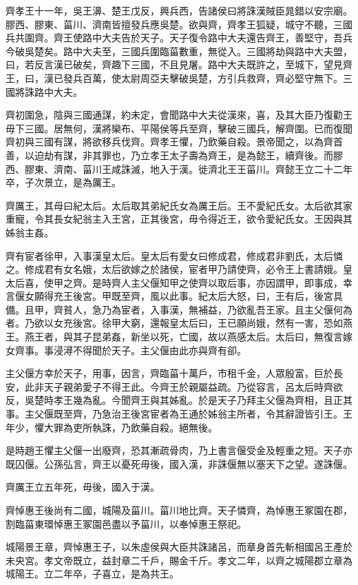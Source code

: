 齊孝王十一年，吳王濞、楚王戊反，興兵西，告諸侯曰將誅漢賊臣晁錯以安宗廟。膠西、膠東、菑川、濟南皆擅發兵應吳楚。欲與齊，齊孝王狐疑，城守不聽，三國兵共圍齊。齊王使路中大夫告於天子。天子復令路中大夫還告齊王，善堅守，吾兵今破吳楚矣。路中大夫至，三國兵圍臨菑數重，無從入。三國將劫與路中大夫盟，曰，若反言漢已破矣，齊趣下三國，不且見屠。路中大夫既許之，至城下，望見齊王，曰，漢已發兵百萬，使太尉周亞夫擊破吳楚，方引兵救齊，齊必堅守無下。三國將誅路中大夫。

齊初圍急，陰與三國通謀，約未定，會聞路中大夫從漢來，喜，及其大臣乃復勸王毋下三國。居無何，漢將欒布、平陽侯等兵至齊，擊破三國兵，解齊圍。已而復聞齊初與三國有謀，將欲移兵伐齊。齊孝王懼，乃飲藥自殺。景帝聞之，以為齊首善，以迫劫有謀，非其罪也，乃立孝王太子壽為齊王，是為懿王，續齊後。而膠西、膠東、濟南、菑川王咸誅滅，地入于漢。徙濟北王王菑川。齊懿王立二十二年卒，子次景立，是為厲王。

齊厲王，其母曰紀太后。太后取其弟紀氏女為厲王后。王不愛紀氏女。太后欲其家重寵，令其長女紀翁主入王宮，正其後宮，毋令得近王，欲令愛紀氏女。王因與其姊翁主姦。

齊有宦者徐甲，入事漢皇太后。皇太后有愛女曰修成君，修成君非劉氏，太后憐之。修成君有女名娥，太后欲嫁之於諸侯，宦者甲乃請使齊，必令王上書請娥。皇太后喜，使甲之齊。是時齊人主父偃知甲之使齊以取后事，亦因謂甲，即事成，幸言偃女願得充王後宮。甲既至齊，風以此事。紀太后大怒，曰，王有后，後宮具備。且甲，齊貧人，急乃為宦者，入事漢，無補益，乃欲亂吾王家。且主父偃何為者。乃欲以女充後宮。徐甲大窮，還報皇太后曰，王已願尚娥，然有一害，恐如燕王。燕王者，與其子昆弟姦，新坐以死，亡國，故以燕感太后。太后曰，無復言嫁女齊事。事浸潯不得聞於天子。主父偃由此亦與齊有卻。

主父偃方幸於天子，用事，因言，齊臨菑十萬戶，市租千金，人眾殷富，巨於長安，此非天子親弟愛子不得王此。今齊王於親屬益疏。乃從容言，呂太后時齊欲反，吳楚時孝王幾為亂。今聞齊王與其姊亂。於是天子乃拜主父偃為齊相，且正其事。主父偃既至齊，乃急治王後宮宦者為王通於姊翁主所者，令其辭證皆引王。王年少，懼大罪為吏所執誅，乃飲藥自殺。絕無後。

是時趙王懼主父偃一出廢齊，恐其漸疏骨肉，乃上書言偃受金及輕重之短。天子亦既囚偃。公孫弘言，齊王以憂死毋後，國入漢，非誅偃無以塞天下之望。遂誅偃。

齊厲王立五年死，毋後，國入于漢。

齊悼惠王後尚有二國，城陽及菑川。菑川地比齊。天子憐齊，為悼惠王冢園在郡，割臨菑東環悼惠王冢園邑盡以予菑川，以奉悼惠王祭祀。

城陽景王章，齊悼惠王子，以朱虛侯與大臣共誅諸呂，而章身首先斬相國呂王產於未央宮。孝文帝既立，益封章二千戶，賜金千斤。孝文二年，以齊之城陽郡立章為城陽王。立二年卒，子喜立，是為共王。

